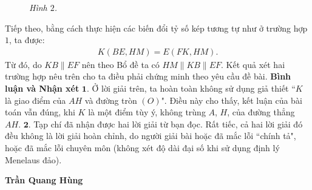 \begin{multicols}{2}
\begin{figure}[H]
		\caption{\small\textit{\color{thachthuctoanhoc}Hình $2$.}}
		\vspace*{-10pt}
	\end{figure}
	Tiếp theo, bằng cách thực hiện các biến đổi tỷ số kép tương tự như ở trường hợp $1$, ta được:
	\begin{align*}
		K\left( {BE,HM} \right) = E\left( {FK,HM} \right).
	\end{align*}
	Từ đó, do $KB \parallel EF$ nên theo Bổ đề ta có $HM \parallel KB \parallel EF$.
	\vskip 0.05cm
	Kết quả xét hai trường hợp nêu trên cho ta điều phải chứng minh theo yêu cầu đề bài.
	\vskip 0.05cm
	\textbf{\color{thachthuctoanhoc}\color{thachthuctoanhoc}Bình luận và Nhận xét}
	\vskip 0.05cm
	$\pmb{1.}$ Ở lời giải trên, ta hoàn toàn không sử dụng giả thiết ``$K$ là giao điểm của $AH$ và đường tròn $(O)$". Điều này cho thấy, kết luận của bài toán vẫn đúng, khi $K$ là một điểm tùy ý, không trùng $A$, $H$, của đường thẳng $AH.$
	\vskip 0.05cm
	$\pmb{2.}$ Tạp chí đã nhận được hai lời giải từ bạn đọc. Rất tiếc, cả hai lời giải đó đều không là lời giải hoàn chỉnh, do người giải bài hoặc đã mắc lỗi ``chính tả", hoặc đã mắc lỗi chuyên môn (không xét độ dài đại số khi sử dụng định lý Menelaus đảo).
	\begin{flushright}
		\textbf{\color{thachthuctoanhoc}\color{thachthuctoanhoc}
			Trần Quang Hùng}
	\end{flushright}
\end{multicols}